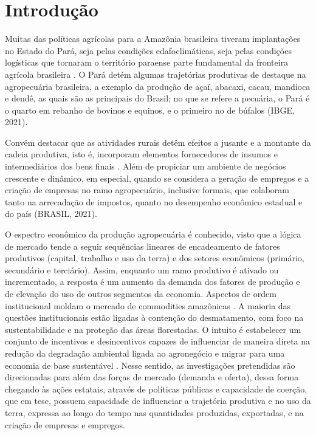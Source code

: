 
\section{Introdução}


Muitas das políticas agrícolas para a Amazônia brasileira tiveram implantações no Estado do Pará, seja pelas condições edafoclimáticas, seja pelas condições logísticas que tornaram o território paraense parte fundamental da fronteira agrícola brasileira \cite{maeda2009predicting}. O Pará detém algumas trajetórias produtivas de destaque na agropecuária brasileira, a exemplo da produção de açaí, abacaxi, cacau, mandioca e dendê, as quais são as principais do Brasil; no que se refere a pecuária, o Pará é o quarto em rebanho de bovinos e equinos, e o primeiro no de búfalos (IBGE, 2021).

Convêm destacar que as atividades rurais detêm efeitos a jusante e a montante da cadeia produtiva, isto é, incorporam elementos fornecedores de insumos e intermediários dos bens finais \cite{pinage2022forest}. Além de propiciar um ambiente de negócios crescente e dinâmico, em especial, quando se considera a geração de empregos e a criação de empresas no ramo agropecuário, inclusive formais, que colaboram tanto na arrecadação de impostos, quanto no desempenho econômico estadual e do país (BRASIL, 2021).

O espectro econômico da produção agropecuária é conhecido, visto que a lógica de mercado tende a seguir sequências lineares de encadeamento de fatores produtivos (capital, trabalho e uso da terra) e dos setores econômicos (primário, secundário e terciário). Assim, enquanto um ramo produtivo é ativado ou incrementado, a resposta é um aumento da demanda dos fatores de produção e de elevação do uso de outros segmentos da economia. Aspectos de ordem institucional moldam o mercado de commodities amazônicas \cite{bolch2020remote}. A maioria das questões institucionais estão ligadas à contenção do desmatamento, com foco na sustentabilidade e na proteção das áreas florestadas. O intuito é estabelecer um conjunto de incentivos e desincentivos capazes de influenciar de maneira direta na redução da degradação ambiental ligada ao agronegócio e migrar para uma economia de base sustentável \cite{zambon2019revolutionizing}. Nesse sentido, as investigações pretendidas são direcionadas para além das forças de mercado (demanda e oferta), dessa forma chegando às ações estatais, através de políticas públicas e capacidade de coerção, que em tese, possuem capacidade de influenciar a trajetória produtiva e no uso da terra, expressa ao longo do tempo nas quantidades produzidas, exportadas, e na criação de empresas e empregos.

